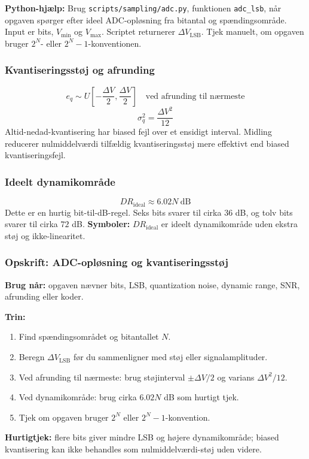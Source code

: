 \textbf{Python-hjælp:} Brug \texttt{scripts/sampling/adc.py}, funktionen \texttt{adc\_lsb}, når opgaven spørger efter ideel ADC-opløsning fra bitantal og spændingsområde. Input er bits, \(V_{\min}\) og \(V_{\max}\). Scriptet returnerer \(\Delta V_{\mathrm{LSB}}\). Tjek manuelt, om opgaven bruger \(2^N\)- eller \(2^N-1\)-konventionen.

\subsubsection{Kvantiseringsstøj og afrunding}
\[
e_q\sim U\left[-\frac{\Delta V}{2},\frac{\Delta V}{2}\right]\quad\text{ved afrunding til nærmeste}
\]
\[
\sigma_q^2=\frac{\Delta V^2}{12}
\]
Altid-nedad-kvantisering har biased fejl over et ensidigt interval. Midling reducerer nulmiddelværdi tilfældig kvantiseringsstøj mere effektivt end biased kvantiseringsfejl.

\subsubsection{Ideelt dynamikområde}
\[
DR_{\mathrm{ideal}}\approx 6.02N\ \mathrm{dB}
\]
Dette er en hurtig bit-til-dB-regel. Seks bits svarer til cirka \(36\) dB, og tolv bits svarer til cirka \(72\) dB.
\textbf{Symboler:} \(DR_{\mathrm{ideal}}\) er ideelt dynamikområde uden ekstra støj og ikke-linearitet.

\subsubsection{Opskrift: ADC-opløsning og kvantiseringsstøj}
\textbf{Brug når:} opgaven nævner bits, LSB, quantization noise, dynamic range, SNR, afrunding eller koder.

\textbf{Trin:}
\begin{enumerate}
    \item Find spændingsområdet og bitantallet \(N\).
    \item Beregn \(\Delta V_{\mathrm{LSB}}\) før du sammenligner med støj eller signalamplituder.
    \item Ved afrunding til nærmeste: brug støjinterval \(\pm\Delta V/2\) og varians \(\Delta V^2/12\).
    \item Ved dynamikområde: brug cirka \(6.02N\) dB som hurtigt tjek.
    \item Tjek om opgaven bruger \(2^N\) eller \(2^N-1\)-konvention.
\end{enumerate}

\textbf{Hurtigtjek:} flere bits giver mindre LSB og højere dynamikområde; biased kvantisering kan ikke behandles som nulmiddelværdi-støj uden videre.

